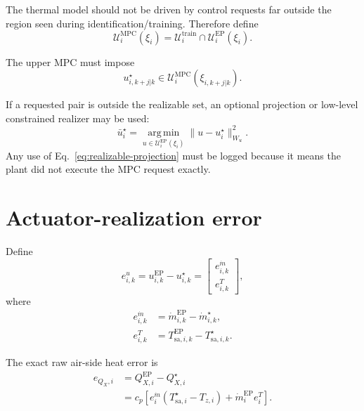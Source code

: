 \documentclass[11pt]{article}
\newcommand{\mdot}{\dot m}
\begin{document}
The thermal model should not be driven by control requests far outside the
region seen during identification/training.  Therefore define
\begin{equation}
\boxed{
\mathcal U_i^{\mathrm{MPC}}(\xi_i)
=
\mathcal U_i^{\mathrm{train}}
\cap
\mathcal U_i^{\mathrm{EP}}(\xi_i).
}
\label{eq:mpc-feasible-set}
\end{equation}

The upper MPC must impose
\begin{equation}
u_{i,k+j|k}^\star
\in
\mathcal U_i^{\mathrm{MPC}}
\left(
\xi_{i,k+j|k}
\right).
\label{eq:mpc-realizable-constraint}
\end{equation}

If a requested pair is outside the realizable set, an optional projection or
low-level constrained realizer may be used:
\begin{equation}
\bar u_i^\star
=
\operatorname*{arg\,min}_{u\in\mathcal U_i^{\mathrm{EP}}(\xi_i)}
\|u-u_i^\star\|_{W_u}^{2}.
\label{eq:realizable-projection}
\end{equation}
Any use of Eq.~\eqref{eq:realizable-projection} must be logged because it means
the plant did not execute the MPC request exactly.

\section{Actuator-realization error}

Define
\begin{equation}
e_{i,k}^{u}
=
u_{i,k}^{\mathrm{EP}}
-
u_{i,k}^{\star}
=
\begin{bmatrix}
e_{i,k}^{\mdot}\\
e_{i,k}^{T}
\end{bmatrix},
\label{eq:realization-error-vector}
\end{equation}
where
\begin{align}
e_{i,k}^{\mdot}
&=
\mdot_{i,k}^{\mathrm{EP}}
-
\mdot_{i,k}^{\star},
\\
e_{i,k}^{T}
&=
T_{\mathrm{sa},i,k}^{\mathrm{EP}}
-
T_{\mathrm{sa},i,k}^{\star}.
\end{align}

The exact raw air-side heat error is
\begin{align}
e_{Q_X,i}
&=
Q_{X,i}^{\mathrm{EP}}
-
Q_{X,i}^{\star}
\nonumber\\
&=
c_p
\left[
e_i^{\mdot}
\left(
T_{\mathrm{sa},i}^\star-T_{z,i}
\right)
+
\mdot_i^{\mathrm{EP}}e_i^T
\right].
\label{eq:exact-qx-error}
\end{align}
\end{document}
